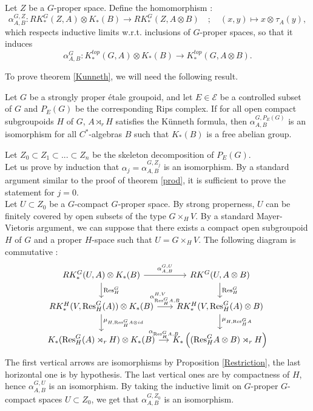 Let $Z$ be a $G$-proper space. Define the homomorphism :
\[\alpha_{A,B}^{G,Z} : RK^G_*(Z,A)\otimes K_*(B)\rightarrow RK_*^G(Z,A\otimes B) \quad ; \quad (x,y)\mapsto x\otimes_{}   \tau_A(y),\]
which respects inductive limits w.r.t. inclusions of $G$-proper spaces, so that it induces
\[\alpha_{A,B}^G : K_*^{top}(G,A)\otimes K_*(B)\rightarrow K_*^{top}(G,A\otimes B ).\]

To prove theorem \ref{Kunneth}, we will need the following result.

\begin{thm}\label{TopologicalKunneth}
Let $G$ be a strongly proper étale groupoid, and let $E\in\mathcal E$ be a controlled subset of $G$ and $P_E(G)$ be the corresponding Rips complex. If for all open compact subgroupoids $H$ of $G$, $A\rtimes_r H$ satisfies the Künneth formula, then $\alpha_{A,B}^{G,P_E(G)}$ is an isomorphism for all $C^*$-algebras $B$ such that $K_*(B)$ is a free abelian group.
\end{thm}

\begin{dem}
Let $Z_0\subset Z_1\subset ... \subset Z_n $ be the skeleton decomposition of $P_E(G)$.\\

Let us prove by induction that $\alpha_j=\alpha^{G,Z_j}_{A,B}$ is an isomorphism. By a standard argument similar to the proof of theorem \ref{prod}, it is sufficient to prove the statement for $j=0$.\\

Let $U\subset Z_0$ be a $G$-compact $G$-proper space. By strong properness, $U$ can be finitely covered by open subsets of the type $G \times_H V$. By a standard Mayer-Vietoris argument, we can suppose that there exists a compact open subgroupoid $H$ of $G$ and a proper $H$-space such that $U = G \times_H V$. The following diagram is commutative :
\[\begin{tikzcd}[column sep = small] RK_*^G(U,A)\otimes K_*(B) \arrow{r}{\alpha_{A,B}^{G,U}} \arrow{d}{\text{Res}_H^G} & RK^G(U, A\otimes B) \arrow{d}{\text{Res}_H^G}\\
RK_*^H(V, \text{Res}_H^G (A))\otimes K_*(B) \arrow{r}{\alpha_{\text{Res}_H^G A,B}^{H,V}} \arrow{d}{\mu_{H,\text{Res}_H^G A \otimes id}} & 
	RK_*^H(V, \text{Res}_H^G (A)\otimes B)\arrow{d}{\mu_{H,\text{Res}_H^G A }} \\
K_*(\text{Res}_H^G (A)\rtimes_r H)\otimes K_*(B)\arrow{r}{\alpha_{\text{Res}_H^G A,B}} & K_*\left((\text{Res}_H^G A\otimes B)\rtimes_r H\right) 
\end{tikzcd}\]
The first vertical arrows are isomorphisms by Proposition \ref{Restriction}, the last horizontal one is by hypothesis. The last vertical ones are by compactness of $H$, hence $\alpha_{A,B}^{G,U}$ is an isomorphism. By taking the inductive limit on $G$-proper $G$-compact spaces $U\subset Z_0$, we get that $\alpha_{A,B}^{G,Z_0}$ is an isomorphism.
\end{dem}

